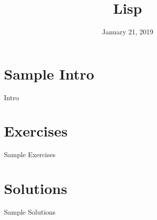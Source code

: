 \documentclass{pset_template}
\title{Lisp}
\date{January 21, 2019}
\begin{document}
\maketitle

\section{Sample Intro}
Intro

\section{Exercises}
Sample Exercises

\section{Solutions}
Sample Solutions
\end{document}
